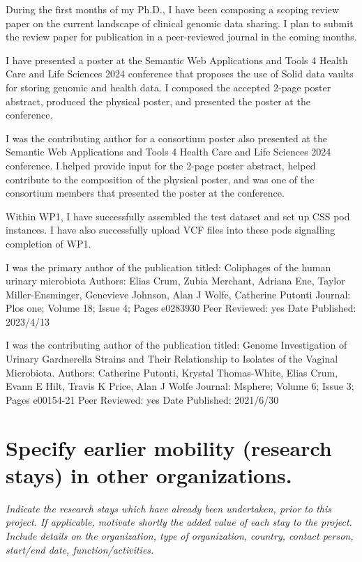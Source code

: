 During the first months of my Ph.D., I have been composing a scoping review paper on the current landscape of clinical genomic data sharing.
I plan to submit the review paper for publication in a peer-reviewed journal in the coming months.

I have presented a poster at the Semantic Web Applications and Tools 4 Health Care and Life Sciences 2024 conference that proposes the use of Solid data vaults for storing genomic and health data.
I composed the accepted 2-page poster abstract, produced the physical poster, and presented the poster at the conference.

I was the contributing author for a consortium poster also presented at the Semantic Web Applications and Tools 4 Health Care and Life Sciences 2024 conference. I helped provide input for the 2-page poster abstract, helped contribute to the composition of the physical poster, and was one of the consortium members that presented the poster at the conference.

Within WP1, I have successfully assembled the test dataset and set up CSS pod instances.
I have also successfully upload VCF files into these pods signalling completion of WP1. 


I was the primary author of the publication titled: Coliphages of the human urinary microbiota
Authors: Elias Crum, Zubia Merchant, Adriana Ene, Taylor Miller-Ensminger, Genevieve Johnson, Alan J Wolfe, Catherine Putonti
Journal: Plos one; Volume 18; Issue 4; Pages e0283930
Peer Reviewed: yes
Date Published: 2023/4/13

I was the contributing author of the publication titled: Genome Investigation of Urinary Gardnerella Strains and Their Relationship to Isolates of the Vaginal Microbiota.
Authors: Catherine Putonti, Krystal Thomas-White, Elias Crum, Evann E Hilt, Travis K Price, Alan J Wolfe
Journal: Msphere; Volume 6; Issue 3; Pages e00154-21
Peer Reviewed: yes
Date Published: 2021/6/30


\section{Specify earlier mobility (research stays) in other organizations.}
\textit{
Indicate the research stays which have already been undertaken, prior to this project. 
If applicable, motivate shortly the added value of each stay to the project. 
Include details on the organization, type of organization, country, contact person, start/end date, function/activities.
}

